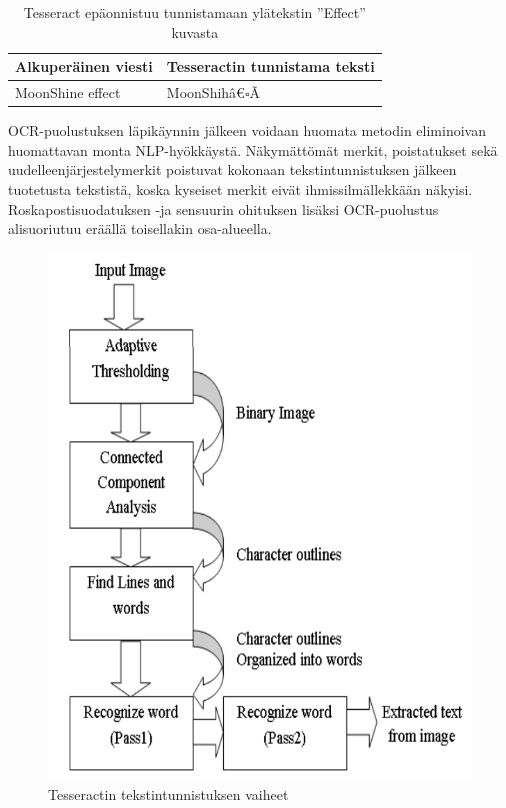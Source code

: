 \begin{table}[t]
  \caption{Tesseract epäonnistuu tunnistamaan ylätekstin ''Effect'' kuvasta \citep{tesseractocr}}
  \begin{tabular}{| l | m{20em} |}
    \hline
    Alkuperäinen viesti & Tesseractin tunnistama teksti\\
    \hline
    MoonShine effect & MoonShih\^a€$\square$\~A\\
    \hline
  \end{tabular}
\end{table}

OCR-puolustuksen läpikäynnin jälkeen voidaan huomata metodin eliminoivan huomattavan monta NLP-hyökkäystä. Näkymättömät merkit, poistatukset sekä uudelleenjärjestelymerkit poistuvat kokonaan tekstintunnistuksen jälkeen tuotetusta tekstistä, koska kyseiset merkit eivät ihmissilmällekkään näkyisi. Roskapostisuodatuksen -ja sensuurin ohituksen lisäksi OCR-puolustus alisuoriutuu eräällä toisellakin osa-alueella.

\begin{figure}[t]
  \includegraphics[scale=0.4]{figures/tesseract.png}
  \caption{Tesseractin tekstintunnistuksen vaiheet \citep{tesseractocr}}
\end{figure}



